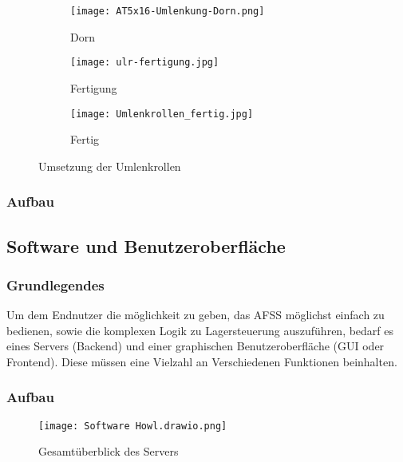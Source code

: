     \begin{figure}[H]
        \centering
        \begin{subfigure}{.3\textwidth}
            \centering
            \texttt{[image: AT5x16-Umlenkung-Dorn.png]}
            \caption{Dorn}
            \label{ulr:dorn}
        \end{subfigure}%
        \begin{subfigure}{.3\textwidth}
            \centering
            \texttt{[image: ulr-fertigung.jpg]}
            \caption{Fertigung}
            \label{ulr:f1}
        \end{subfigure}%
        \begin{subfigure}{.3\textwidth}
            \centering
            \texttt{[image: Umlenkrollen\_fertig.jpg]}
            \caption{Fertig}
            \label{ulr:f2}
        \end{subfigure}
        \caption{Umsetzung der Umlenkrollen}
        \label{ulr}
    \end{figure}



\subsubsection{Aufbau}

\newpage
\subsection{Software und Benutzeroberfläche}

\subsubsection{Grundlegendes}

Um dem Endnutzer die möglichkeit zu geben, das AFSS möglichst einfach zu bedienen, sowie die komplexen Logik zu Lagersteuerung auszuführen, bedarf es eines Servers (Backend) und einer graphischen Benutzeroberfläche (GUI oder Frontend). Diese müssen eine Vielzahl an Verschiedenen Funktionen beinhalten.

\subsubsection{Aufbau}
\begin{figure}[h]
    \texttt{[image: Software Howl.drawio.png]}
    \caption{Gesamtüberblick des Servers}
\end{figure}


